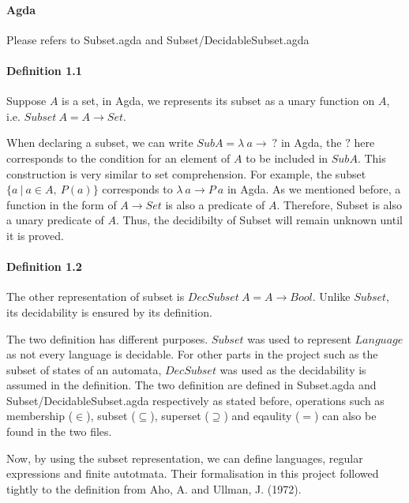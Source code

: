 \documentclass[twoside,openright,final]{bhamthesis}
\begin{document}
\paragraph{Agda} Please refers to Subset.agda and Subset/DecidableSubset.agda

\paragraph{Definition 1.1} Suppose \(A\) is a set, in Agda, we represents its subset as a unary function on
\(A\), i.e. \(Subset\ A = A \to Set\). \\

\par When declaring a subset, we can write \(SubA =
\lambda\ a \to\ ?\) in Agda, the \(?\) here corresponds to the
condition for an element of \(A\) to be included in \(SubA\). This construction is
very similar to set comprehension. For example, the subset 
\(\{a\ | \ a \in A,\ P(a)\}\) corresponds to \(\lambda\ a \to P\ a\)
in Agda. As we mentioned before, a function in the form of \(A \to
Set\) is also a predicate of \(A\). Therefore, Subset is also a unary
predicate of \(A\). Thus, the decidibilty of Subset will remain
unknown until it is proved. 

\paragraph{Definition 1.2} The other representation of subset is \(DecSubset\ A = A \to
Bool\). Unlike \(Subset\), its decidability is ensured by its
definition. \\

\par The two definition has different purposes. \(Subset\) was used to represent \(Language\) as not every
language is decidable. For other parts in the project 
such as the subset of states of an automata, \(DecSubset\) was used
as the decidability is assumed in the definition. The two definition
are defined in Subset.agda and Subset/DecidableSubset.agda
respectively as stated before, operations such as membership (\(\in\)), subset
(\(\subseteq\)), superset (\(\supseteq\)) and eqaulity (\(=\)) can
also be found in the two files. 

\par Now, by using the subset representation, we can define languages, regular expressions and finite
autotmata. Their formalisation in this project followed tightly to the
definition from Aho, A. and Ullman, J. (1972). 
\end{document}
